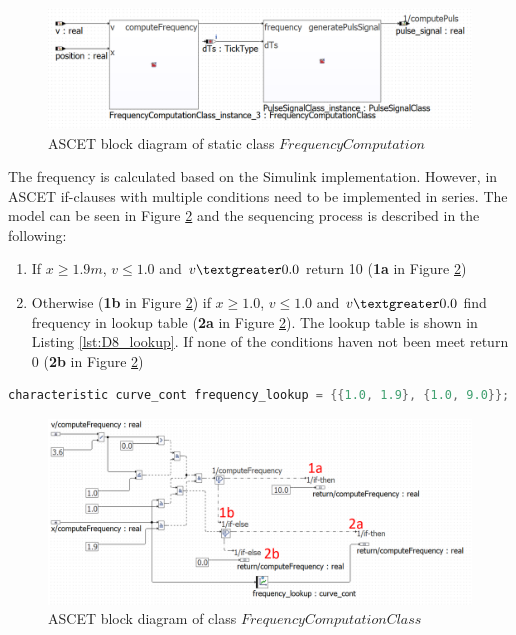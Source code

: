 \begin{figure}[H]
\centering
\includegraphics[width=1\textwidth]{images/Blockdiagramm_FrequencyComputation.png}
\caption{ASCET block diagram of static class $FrequencyComputation$}
\label{fig:BlockdiagrammFrequencyComputation}
\end{figure}

The frequency is calculated based on the Simulink implementation. However, in ASCET if-clauses with multiple conditions need to be implemented in series. The model can be seen in Figure \ref{fig:BlockdiagrammFrequencyComputationClass} and the sequencing process is described in the following:

\begin{enumerate}
\item If $x \geq 1.9m$, $v \leq 1.0$ and $v \textgreater 0.0$ return 10 (\textbf{1a} in Figure \ref{fig:BlockdiagrammFrequencyComputationClass})
\item Otherwise (\textbf{1b} in Figure \ref{fig:BlockdiagrammFrequencyComputationClass}) if $x \geq 1.0$, $v \leq 1.0$ and $v \textgreater 0.0$ find frequency in lookup table (\textbf{2a} in Figure \ref{fig:BlockdiagrammFrequencyComputationClass}). The lookup table is shown in Listing \ref{lst:D8_lookup}. If none of the conditions haven not been meet return 0 (\textbf{2b} in Figure \ref{fig:BlockdiagrammFrequencyComputationClass})
\end{enumerate}

\begin{lstlisting}[language=Java,basicstyle=\scriptsize, caption= ASCET frequency lookup table,label= lst:D8_lookup]
characteristic curve_cont frequency_lookup = {{1.0, 1.9}, {1.0, 9.0}};
\end{lstlisting}

\begin{figure}[H]
\centering
\includegraphics[width=1\textwidth]{images/Blockdiagramm_FrequencyComputationClassAnno.png}
\caption{ASCET block diagram of class $FrequencyComputationClass$}
\label{fig:BlockdiagrammFrequencyComputationClass}
\end{figure}


